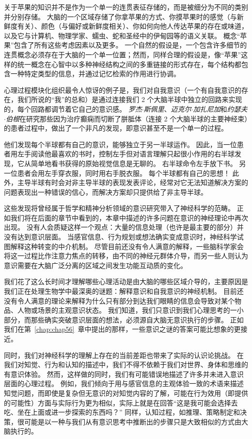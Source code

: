 关于苹果的知识并不是作为一个单一的连贯表征存储的，而是被细分为不同的类别并分别存储。
大脑的一个区域存储了你拿苹果的方式、你摸苹果时的感觉（与新鲜度有关）、颜色（与偏好或新鲜度相关）、你如何向他人传达苹果的存在或味道，以及它与计算机、物理学家、蠕虫、蛇和圣经中的伊甸园等的语义关联。
概念“苹果”包含了所有这些考虑因素以及更多。
一个自然的假设是，一个包含许多细节的连贯概念必须存在于大脑的一个单一位置；然而，同样合理的假设是，像“苹果”这样的统一概念在心智中以多种神经结构之间的多重链接的形式存在，每个结构都包含一种特定类型的信息，并通过记忆检索的作用进行协调。


心理过程模块化组织最令人惊讶的例子是，我们对自我意识（一个有自我意识的存在，我们所说的“我”的总和）是通过连接我们 2 个大脑半球中独立的回路来实现的，每个回路都调节着它自己的意识感。
\textit{罗杰$\cdot$斯佩里}、\textit{迈克尔$\cdot$加扎尼加}和\textit{约瑟夫$\cdot$伯根}在研究那些因为治疗癫痫而切断了胼胝体（连接 2 个大脑半球的主要神经束）的患者过程中，做出了一个非凡的发现，即意识甚至不是一个单一的过程。


他们发现每个半球都有自己的意识，能够独立于另一半球运作。
因此，当一位患者用左手阅读他最喜欢的书时，控制左手但对语言理解只起很小作用的右半球发现，它从简单地看书获得的原始视觉信息是无聊的。
右半球命令左手放下书。
另一位患者会用左手穿衣服，同时用右手脱衣服。
每个半球都有自己的思想！
此外，主导半球有时会对非主导半球的表现发表评论，经常对它无法知道解决方案的问题表现出一种错误的信心，而解决方案却只提供给了非主导半球。




这些发现将曾经属于哲学和精神分析领域的意识研究带入了神经科学的范畴。
正如我们将在后面的章节中看到的，本章中描述的许多问题在意识的神经理论中再次出现。
没有人会质疑这样一个观点：大量的信息处理（也许是最主要的部分）并没有达到意识层面。
当感官信息、行为规划或想法确实变成意识时，神经科学试图解释这种转变的中介机制。
尽管目前还没有令人满意的解释，一些脑科学家会将这一过程比作注意力焦点的转移，由不同的神经元群体介导，而另一些人则认为意识需要在大脑广泛分离的区域之间发生功能互动质的变化。




我们花了这么长时间才理解哪些心理活动是由大脑的哪些区域介导的，主要原因是我们正在处理生物学中最深奥的谜题：解释意识和自我意识的神经机制。
目前还没有令人满意的理论来解释为什么只有部分到达我们眼睛的信息会导致对某个物品、人物或场景的主观意识状态。
我们知道，我们只意识到我们心理思考的一小部分，而那些确实突破意识层面的想法，必须源自大脑无意识执行的步骤。
正如我们在第~\ref{chap:chap56}~章中提出的那样，一些意识之谜的答案可能比想象的更接近。


同时，我们对神经科学的理解上存在的当前差距也带来了实际的认识论挑战。
在我们对知觉、行为和认知的描述中，我们不得不依赖于我们对世界、身体和思维的有意识体验。
然而，这样做的同时，我们有可能错误地描述了许多并未进入意识层面的心理过程。
例如，我们倾向于用与感官信息的主观体验一致的术语来描述知觉问题，而即使是复杂但无意识的对知觉内容的了解，可能在行为效用（即提供的可能性）方面与实际行为更为相似，实际上就是在回答“这是我可能会选择去吃、坐在上面或进一步探索的东西吗？”
同样，认知过程，如推理、策略制定和决策，很可能是以一种与我们从有意识思考中推断出的步骤只是大致相似的方式由大脑执行的。





